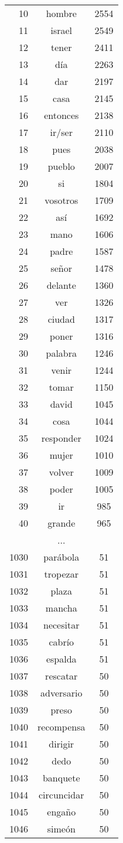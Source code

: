 \begin{figure*}
\begin{tiny}
\begin{centering}
\begin{tabular}{|r|c|c|}
10 & hombre & 2554 \\
11 & israel & 2549 \\
12 & tener & 2411 \\
13 & día & 2263 \\
14 & dar & 2197 \\
15 & casa & 2145 \\
16 & entonces & 2138 \\
17 & ir/ser & 2110 \\
18 & pues & 2038 \\
19 & pueblo & 2007 \\
20 & si & 1804 \\
21 & vosotros & 1709 \\
22 & así & 1692 \\
23 & mano & 1606 \\
24 & padre & 1587 \\
25 & señor & 1478 \\
26 & delante & 1360 \\
27 & ver & 1326 \\
28 & ciudad & 1317 \\
29 & poner & 1316 \\
30 & palabra & 1246 \\
31 & venir & 1244 \\
32 & tomar & 1150 \\
33 & david & 1045 \\
34 & cosa & 1044 \\
35 & responder & 1024 \\
36 & mujer & 1010 \\
37 & volver & 1009 \\
38 & poder & 1005 \\
39 & ir & 985 \\
40 & grande & 965 \\
    \multicolumn{3}{|c|}{...} \\ 
1030 & parábola & 51 \\
1031 & tropezar & 51 \\
1032 & plaza & 51 \\
1033 & mancha & 51 \\
1034 & necesitar & 51 \\
1035 & cabrío & 51 \\
1036 & espalda & 51 \\
1037 & rescatar & 50 \\
1038 & adversario & 50 \\
1039 & preso & 50 \\
1040 & recompensa & 50 \\
1041 & dirigir & 50 \\
1042 & dedo & 50 \\
1043 & banquete & 50 \\
1044 & circuncidar & 50 \\
1045 & engaño & 50 \\
1046 & simeón & 50 \\
    \hline


\end{tabular}
\end{centering}
\end{tiny}
\end{figure*}
